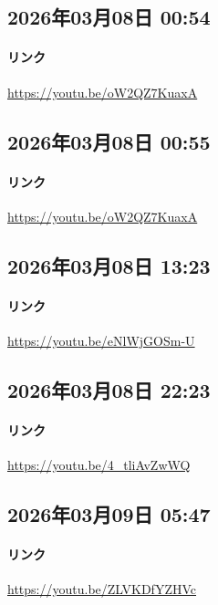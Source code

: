 \subsection*{2026年03月08日 00:54}

\paragraph{リンク}
\url{https://youtu.be/oW2QZ7KuaxA}

\subsection*{2026年03月08日 00:55}

\paragraph{リンク}
\url{https://youtu.be/oW2QZ7KuaxA}

\subsection*{2026年03月08日 13:23}

\paragraph{リンク}
\url{https://youtu.be/eNlWjGOSm-U}

\subsection*{2026年03月08日 22:23}

\paragraph{リンク}
\url{https://youtu.be/4_tliAvZwWQ}

\subsection*{2026年03月09日 05:47}

\paragraph{リンク}
\url{https://youtu.be/ZLVKDfYZHVc}

